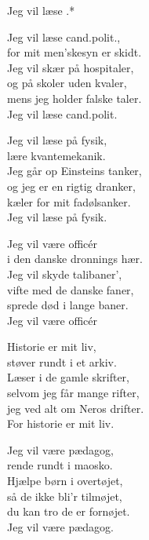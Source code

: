\begin{song}{Jeg vil læse .*}
  \begin{SBVerse}
    Jeg vil læse cand.polit.,\\
    for mit men'skesyn er skidt.\\
    Jeg vil skær på hospitaler,\\
    og på skoler uden kvaler,\\
    mens jeg holder falske taler.\\
    Jeg vil læse cand.polit.
  \end{SBVerse}

  \begin{SBVerse}
    Jeg vil læse på fysik,\\
    lære kvantemekanik.\\
    Jeg går op Einsteins tanker,\\
    og jeg er en rigtig dranker,\\
    kæler for mit fadølsanker.\\
    Jeg vil læse på fysik.
  \end{SBVerse}

  \begin{SBVerse}
    Jeg vil være officér\\
    i den danske dronnings hær.\\
    Jeg vil skyde talibaner',\\
    vifte med de danske faner,\\
    sprede død i lange baner.\\
    Jeg vil være officér
  \end{SBVerse}

  \begin{SBVerse}
    Historie er mit liv,\\
    støver rundt i et arkiv.\\
    Læser i de gamle skrifter,\\
    selvom jeg får mange rifter,\\
    jeg ved alt om Neros drifter.\\
    For historie er mit liv.
  \end{SBVerse}

  \begin{SBVerse}
    Jeg vil være pædagog,\\
    rende rundt i maosko.\\
    Hjælpe børn i overtøjet,\\
    så de ikke bli'r tilmøjet,\\
    du kan tro de er fornøjet.\\
    Jeg vil være pædagog.
  \end{SBVerse}


\end{song}
